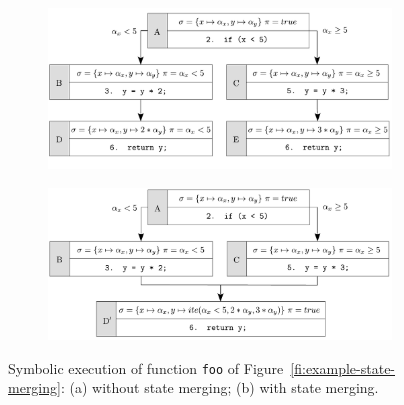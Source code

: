 \begin{figure}[t]
  \vspace{-3mm}
  \centering
  \begin{subfigure}{.5\textwidth}
    \centering
    \hspace{-5mm}
    \includegraphics[width=1.05\columnwidth]{images/state-merging} 
    \vspace{-6.5mm}
    \caption{}
  \end{subfigure}%
  \begin{subfigure}{.5\textwidth}
    \centering
    \includegraphics[width=1.05\columnwidth]{images/state-merging-2} 
    \vspace{-4mm}
    \caption{}
  \end{subfigure}
  \vspace{-3mm}
  \caption{Symbolic execution of function \texttt{foo} of Figure~\ref{fi:example-state-merging}: (a) without state merging; (b) with state merging.}
  \label{fig:example-state-merging}
\end{figure}


